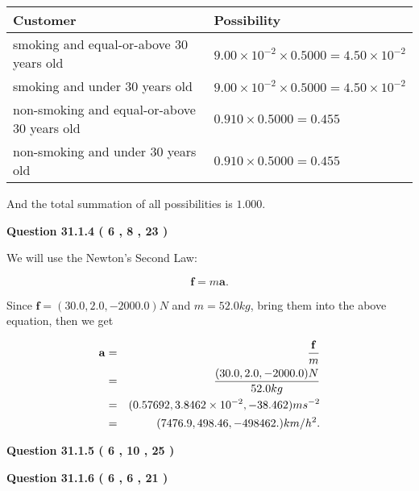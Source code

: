 \documentclass[12pt]{article}
\begin{document}
\noindent
\begin{tabular}{|l|l|}
\hline
Customer & Possibility \\
\hline
smoking  and  %
equal-or-above 30 years old  &
  $ %
9.00 \times 10^{-2} \times  %
0.5000 =  %
4.50 \times 10^{-2}$ \\
\hline
smoking  and  %
under 30 years old &
  $ %
9.00 \times 10^{-2} \times  %
0.5000 =  %
4.50 \times 10^{-2}$ \\
\hline
 non-smoking and  %
equal-or-above 30 years old  &
  $ %
0.910 \times  %
0.5000 =  %
0.455$ \\
\hline
 non-smoking and  %
under 30 years old &
  $ %
0.910 \times  %
0.5000 =  %
0.455$ \\
\hline
\end{tabular}
 
\noindent
And the total summation of all possibilities is $  %
1.000 $.
 
 
 
 
  
\vspace{0.2in}
  
{\textbf{\Large{Question
31.1.4 
 (           6 ,           8 ,          23 )
}}}
  
  
 
 

We will use the Newton's Second Law:
 
\[
\mathbf{f}=m\mathbf{a}.
\]
 
Since $\mathbf{f}=( %
30.0,  %
2.0,  %
-2000.0 )N$
and $m= %
52.0kg$, bring them into the above equation, then we get
 
\begin{eqnarray*}
\mathbf{a}&=&\frac{\mathbf{f}}m  \\
&=&\frac{(
30.0 ,
2.0 ,
-2000.0 )N
}{ %
52.0 kg}  \\
&=&(
0.57692 ,
3.8462 \times 10^{-2},
-38.462
)ms^{-2} \\
&=&(
7476.9 ,
498.46 ,
-498462.
)km/h^2.
\end{eqnarray*}
 
 
 
  
\vspace{0.2in}
  
{\textbf{\Large{Question
31.1.5 
 (           6 ,          10 ,          25 )
}}}
  
  
  
\vspace{0.2in}
  
{\textbf{\Large{Question
31.1.6 
 (           6 ,           6 ,          21 )
}}}
  
\end{document}
